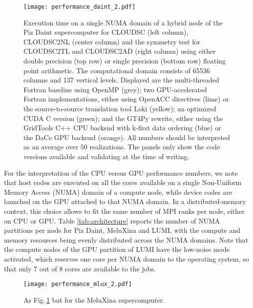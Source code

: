 \documentclass[main.tex]{subfiles}
\begin{document}
        \begin{figure}[t!]
            \centering
            \texttt{[image: performance\_daint\_2.pdf]}
            \caption{Execution time on a single NUMA domain of a hybrid node of the Piz Daint supercomputer for CLOUDSC (left column), CLOUDSC2NL (center column) and the symmetry test for CLOUDSC2TL and CLOUDSC2AD (right column) using either double precision (top row) or single precision (bottom row) floating point arithmetic. The computational domain consists of 65536 columns and 137 vertical levels. Displayed are the multi-threaded Fortran baseline using OpenMP (grey); two GPU-accelerated Fortran implementations, either using OpenACC directives (lime) or the source-to-source translation tool Loki (yellow); an optimized CUDA C version (green); and the GT4Py rewrite, either using the GridTools C++ CPU backend with k-first data ordering (blue) or the DaCe GPU backend (orange). All numbers should be interpreted as an average over $50$ realizations. The panels only show the code versions available and validating at the time of writing.}
            \label{fig:performance-daint}
        \end{figure}

        \noindent For the interpretation of the CPU versus GPU performance numbers, we note that host codes are executed on all the cores available on a single Non-Uniform Memory Access (NUMA) domain of a compute node, while device codes are launched on the GPU attached to that NUMA domain. In a distributed-memory context, this choice allows to fit the same number of MPI ranks per node, either on CPU or GPU. Table \ref{tab:architecture} reports the number of NUMA partitions per node for Piz Daint, MeluXina and LUMI, with the compute and memory resources being evenly distributed across the NUMA domains. Note that the compute nodes of the GPU partition of LUMI have the low-noise mode activated, which reserves one core per NUMA domain to the operating system, so that only 7 out of 8 cores are available to the jobs. 

        \begin{figure}[t!]
            \centering
            \texttt{[image: performance\_mlux\_2.pdf]}
            \caption{As Fig.\,\ref{fig:performance-daint} but for the MeluXina supercomputer.}
            \label{fig:performance-mlux}
        \end{figure}
\end{document}
